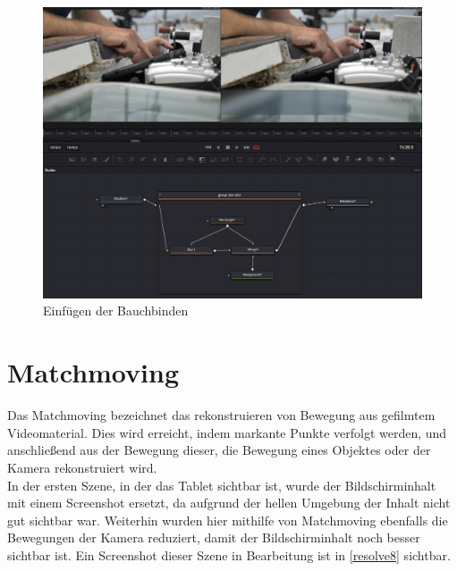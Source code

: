\begin{figure}[H]
\begin{center}
\includegraphics[width=\textwidth]{gfx/post/resolve3.jpg}
\caption{Einfügen der Bauchbinden}
\label{resolve3}
\end{center}
\end{figure}

\section{Matchmoving}



Das Matchmoving bezeichnet das rekonstruieren von Bewegung aus gefilmtem Videomaterial. Dies wird erreicht, indem markante Punkte verfolgt werden, und anschließend aus der Bewegung dieser, die Bewegung eines Objektes oder der Kamera rekonstruiert wird. \\
In der ersten Szene, in der das Tablet sichtbar ist, wurde der Bildschirminhalt mit einem Screenshot ersetzt, da aufgrund der hellen Umgebung der Inhalt nicht gut sichtbar war. Weiterhin wurden hier mithilfe von Matchmoving ebenfalls die Bewegungen der Kamera reduziert, damit der Bildschirminhalt noch besser sichtbar ist. Ein Screenshot dieser Szene in Bearbeitung ist in \autoref{resolve8} sichtbar.\\


